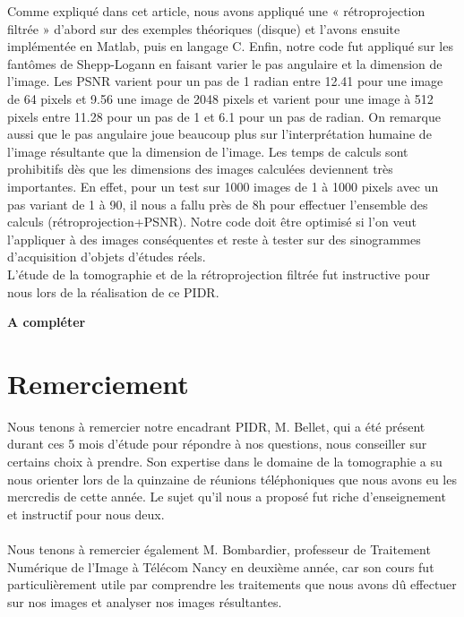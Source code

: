 \documentclass[conference]{IEEEtran}
\begin{document}
Comme expliqué dans cet article, nous avons appliqué une « rétroprojection filtrée » d’abord sur des exemples théoriques (disque) et l’avons ensuite implémentée en Matlab, puis en langage C. Enfin, notre code fut appliqué sur les fantômes de Shepp-Logann en faisant varier le pas angulaire et la dimension de l'image. Les PSNR varient pour un pas de 1 radian entre 12.41 pour une image de 64 pixels et 9.56 une image de 2048 pixels et varient pour une image à 512 pixels entre 11.28 pour un pas de 1 et 6.1 pour un pas de radian. On remarque aussi que le pas angulaire joue beaucoup plus sur l'interprétation humaine de l'image résultante que la dimension de l'image. Les temps de calculs sont prohibitifs dès que les dimensions des images calculées deviennent très importantes. En effet, pour un test sur 1000 images de 1 à 1000 pixels avec un pas variant de 1 à 90, il nous a fallu près de 8h pour effectuer l'ensemble des calculs (rétroprojection+PSNR). Notre code doit être optimisé si l'on veut l'appliquer à des images conséquentes et reste à tester sur des sinogrammes d'acquisition d'objets d'études réels. 
\\
L'étude de la tomographie et de la rétroprojection filtrée fut instructive pour nous lors de la réalisation de ce PIDR.

\textbf{A compléter}






\section*{Remerciement}

Nous tenons à remercier notre encadrant PIDR, M. Bellet, qui a été présent durant ces 5 mois d'étude pour répondre à nos questions, nous conseiller sur certains choix à prendre. Son expertise dans le domaine de la tomographie a su nous orienter lors de la quinzaine de réunions téléphoniques que nous avons eu les mercredis de cette année. Le sujet qu'il nous a proposé fut riche d'enseignement et instructif pour nous deux.
\\
\\
Nous tenons à remercier également M. Bombardier, professeur de Traitement Numérique de l'Image à Télécom Nancy en deuxième année, car son cours fut particulièrement utile par comprendre les traitements que nous avons dû effectuer sur nos images et analyser nos images résultantes.
\end{document}

